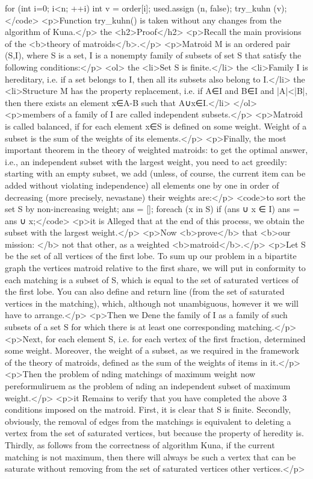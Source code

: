 for (int i=0; i<n; ++i) {
int v = order[i];
used.assign (n, false);
try_kuhn (v);
}</code>
<p>Function try_kuhn() is taken without any changes from the algorithm of Kuna.</p>
the <h2>Proof</h2>
<p>Recall the main provisions of the <b>theory of matroids</b>.</p>
<p>Matroid M is an ordered pair (S,I), where S is a set, I is a nonempty family of subsets of set S that satisfy the following conditions:</p>
<ol>
the <li>Set S is finite.</li>
the <li>Family I is hereditary, i.e. if a set belongs to I, then all its subsets also belong to I.</li>
the <li>Structure M has the property replacement, i.e. if A∈I and B∈I and |A|<|B|, then there exists an element x∈A-B such that A∪x∈I.</li>
</ol>
<p>members of a family of I are called independent subsets.</p>
<p>Matroid is called balanced, if for each element x∈S is defined on some weight. Weight of a subset is the sum of the weights of its elements.</p>
<p>Finally, the most important theorem in the theory of weighted matroids: to get the optimal answer, i.e., an independent subset with the largest weight, you need to act greedily: starting with an empty subset, we add (unless, of course, the current item can be added without violating independence) all elements one by one in order of decreasing (more precisely, nevastane) their weights are:</p>
<code>to sort the set S by non-increasing weight;
ans = [];
foreach (x in S)
if (ans ∪ x ∈ I)
ans = ans ∪ x;</code>
<p>it is Alleged that at the end of this process, we obtain the subset with the largest weight.</p>
<p>Now <b>prove</b> that <b>our mission: </b> not that other, as a weighted <b>matroid</b>.</p>
<p>Let S be the set of all vertices of the first lobe. To sum up our problem in a bipartite graph the vertices matroid relative to the first share, we will put in conformity to each matching is a subset of S, which is equal to the set of saturated vertices of the first lobe. You can also define and return line (from the set of saturated vertices in the matching), which, although not unambiguous, however it we will have to arrange.</p>
<p>Then we Dene the family of I as a family of such subsets of a set S for which there is at least one corresponding matching.</p>
<p>Next, for each element S, i.e. for each vertex of the first fraction, determined some weight. Moreover, the weight of a subset, as we required in the framework of the theory of matroids, defined as the sum of the weights of items in it.</p>
<p>Then the problem of nding matchings of maximum weight now pereformuliruem as the problem of nding an independent subset of maximum weight.</p>
<p>it Remains to verify that you have completed the above 3 conditions imposed on the matroid. First, it is clear that S is finite. Secondly, obviously, the removal of edges from the matchings is equivalent to deleting a vertex from the set of saturated vertices, but because the property of heredity is. Thirdly, as follows from the correctness of algorithm Kuna, if the current matching is not maximum, then there will always be such a vertex that can be saturate without removing from the set of saturated vertices other vertices.</p>
